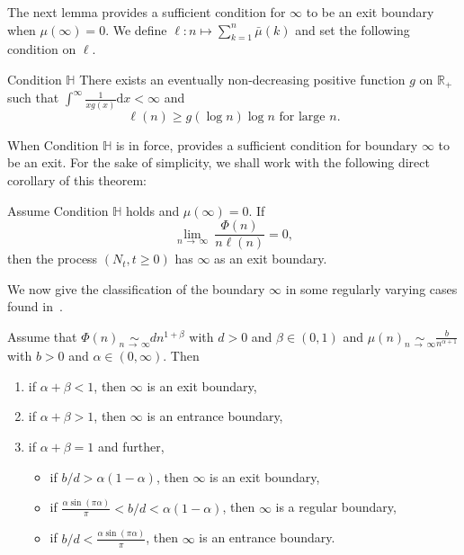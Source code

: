 \documentclass[AHL,Unicode,longabstracts,published]{cedram}
\newcommand{\ddr}{\mathrm{d}}
\newcommand{\bbR}{\mathbb{R}}
\newcommand{\bbH}{\mathbb{H}}
\newcommand*{\romanenumi}{\renewcommand*{\theenumi}{\roman{enumi}}}
\begin{document}
The next lemma provides a sufficient condition for $\infty$ to be an exit boundary when $\mu(\infty)=0$. We define $\ell :n\mapsto \sum_{k=1}^{n}\bar{\mu}(k)$ and set the following condition on $\ell$.

\begin{enonce*}{Condition $\bbH$} 
There exists an eventually non-decreasing positive function $g$ on $\bbR_+$ such that $\int^{\infty}\frac{1}{xg(x)}\ddr x<\infty$ and
\begin{equation*}
\ell(n)\geq g(\log n)\log n \text{ for large } n.
\end{equation*}
\end{enonce*}

When Condition $\bbH$ is in force, \cite[Theorem~3.1]{explosion} provides a sufficient condition for boundary $\infty$ to be an exit. For the sake of simplicity, we shall work with the following direct corollary of this theorem:

\begin{lemm}\label{suffcondexitN}
Assume Condition $\bbH$ holds and $\mu(\infty)=0$. If
\begin{equation*}\label{suffcondentrancePhi}
\underset{n\,\rightarrow\,\infty}{\lim}\ \frac{\Phi(n)}{n\ell(n)}=0,
\end{equation*}
then the process $(N_t,t\geq 0)$ has $\infty$ as an exit boundary.
\end{lemm}

We now give the classification of the boundary $\infty$ in some regularly varying cases found in~\cite{explosion}.

\pagebreak
\begin{lemm}\label{stablefragtheorem}
Assume that $\Phi(n)\underset{n\,\rightarrow\,\infty}{\sim} dn^{1+\beta}$ with $d>0$ and $\beta\in (0,1)$ and $\mu(n)\underset{n\,\rightarrow\,\infty}{\sim} \frac{b}{n^{\alpha+1}}$ with $b>0$ and $\alpha\in (0,\infty)$. Then
\begin{enumerate}\romanenumi
\item\label{lemm3.9.I} if $\alpha+\beta<1$, then $\infty$ is an exit boundary,
\vspace*{1mm}
\item\label{lemm3.9.II} if $\alpha+\beta>1$, then $\infty$ is an entrance boundary,
\vspace*{1mm}
\item\label{lemm3.9.III} if $\alpha+\beta=1$ and further,
\vspace*{2mm}
\begin{itemize}
\item if $b/d>\alpha(1-\alpha)$, then $\infty$ is an exit boundary,
\vspace*{2mm}
\item if $\frac{\alpha \sin(\pi \alpha)}{\pi}<b/d<\alpha(1-\alpha)$, then $\infty$ is a regular boundary,
\vspace*{2mm}
\item if $b/d<\frac{\alpha \sin(\pi \alpha)}{\pi}$, then $\infty$ is an entrance boundary.
\end{itemize}
\end{enumerate}
\end{lemm}
\end{document}
